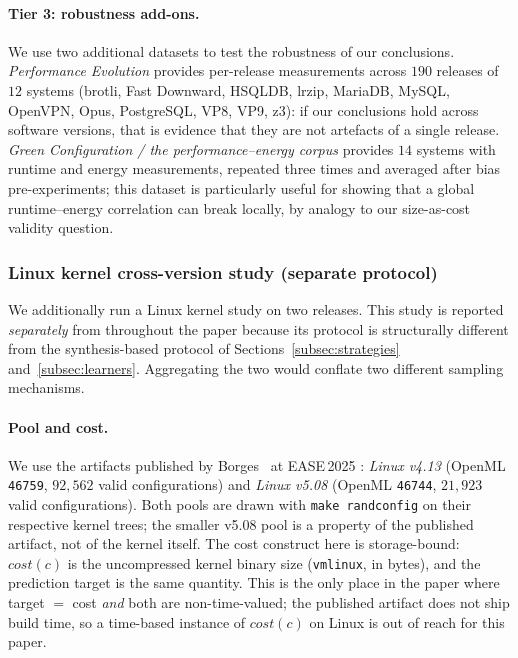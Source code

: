 \paragraph*{Tier 3: robustness add-ons.}
We use two additional datasets to test the robustness of our conclusions.
\emph{Performance Evolution}
provides per-release measurements across $190$ releases of $12$ systems
(brotli, Fast Downward, HSQLDB, lrzip, MariaDB, MySQL, OpenVPN, Opus,
PostgreSQL, VP8, VP9, z3): if our conclusions hold across software
versions, that is evidence that they are not artefacts of a single
release. \emph{Green Configuration / the performance--energy corpus}
 provides $14$ systems with
runtime and energy measurements, repeated three times and averaged after
bias pre-experiments; this dataset is particularly useful for showing that
a global runtime--energy correlation can break locally, by analogy to our
size-as-cost validity question.

\subsubsection{Linux kernel cross-version study (separate protocol)}
\label{subsubsec:linux-protocol}

We additionally run a Linux kernel study on two \dsTux releases.
This study is reported \emph{separately} from \StudyReplication
throughout the paper because its protocol is structurally different
from the synthesis-based protocol of Sections~\ref{subsec:strategies}
and~\ref{subsec:learners}. Aggregating the two would conflate two
different sampling mechanisms.

\paragraph*{Pool and cost.}
We use the \dsTux artifacts published by Borges \etal\ at
EASE\,2025 : \emph{Linux v4.13} (OpenML
\texttt{46759}, $92{,}562$ valid configurations) and \emph{Linux v5.08}
(OpenML \texttt{46744}, $21{,}923$ valid configurations). Both pools
are drawn with \texttt{make randconfig} on their respective kernel
trees; the smaller v5.08 pool is a property of the published artifact,
not of the kernel itself. The cost construct here is
storage-bound: $\mathit{cost}(c)$ is the uncompressed kernel binary
size (\texttt{vmlinux}, in bytes), and the prediction target is the
same quantity. This is the only place in the paper where target $=$
cost \emph{and} both are non-time-valued; the published artifact does
not ship build time, so a time-based instance of $\mathit{cost}(c)$
on Linux is out of reach for this paper.

